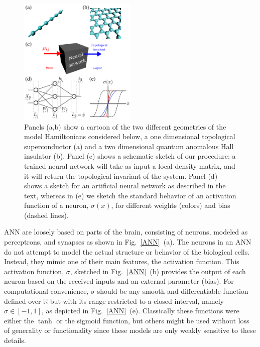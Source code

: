 \begin{figure}[ht!]
\centering
\includegraphics[width=0.5\textwidth]{ann/figures/fig1.pdf}
\vspace{-5pt}
\caption{
Panels (a,b) show a cartoon of the two different geometries of the model Hamiltonians considered  below, 
a one dimensional topological superconductor  (a) and a two dimensional  quantum anomalous Hall insulator (b).
Panel (c) shows a schematic sketch of our procedure: a trained neural network
will take as input a local density matrix, and it will return the topological
invariant of the system.
Panel (d) shows a sketch for an artificial neural network as described in the text, whereas
in (e) we sketch the standard behavior of an activation function of a neuron,
$\sigma(x)$, for different weights (colors) and bias (dashed lines).
}
\label{ANN}
\label{fig1}
\end{figure}

ANN are loosely based on parts of the brain, consisting of neurons, modeled as
perceptrons\cite{Rosenblatt1958}, and synapses as shown in Fig.~\ref{ANN}~(a).
The neurons in an ANN do not attempt to model the actual structure or behavior
of the biological cells\cite{Hodgkin1952}. Instead, they mimic one of their main
features, the activation function.
This activation function, $\sigma$, sketched in Fig.~\ref{ANN}~(b) provides the
output of each neuron based on the received inputs and an external parameter
(bias). For computational convenience, $\sigma$ should be any smooth and
differentiable function defined over $\mathbb{R}$ but with its range restricted
to a closed interval, namely $\sigma\in[-1,1]$, as depicted in Fig.~\ref{ANN}~(e).
Classically these functions were either the $\tanh$ or the sigmoid function, but others might be used without loss of generality or functionality since these models are only weakly sensitive to these details.\cite{Hopfield1982}


